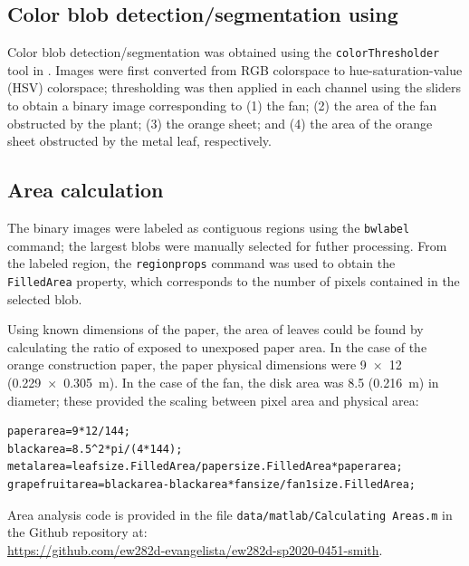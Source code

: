 \subsection{Color blob detection/segmentation using \Matlab}
Color blob detection/segmentation was obtained using the \lstinline{colorThresholder} tool in \Matlab. Images were first converted from RGB colorspace to hue-saturation-value (HSV) colorspace; thresholding was then applied in each channel using the sliders to obtain a binary image corresponding to (1) the fan; (2) the area of the fan obstructed by the plant; (3) the orange sheet; and (4) the area of the orange sheet obstructed by the metal leaf, respectively. 

\subsection{Area calculation}
The binary images were labeled as contiguous regions using the \lstinline{bwlabel} command; the largest blobs were manually selected for futher processing. From the labeled region, the \lstinline{regionprops} command was used to obtain the \lstinline{FilledArea} property, which corresponds to the number of pixels contained in the selected blob. 

Using known dimensions of the paper, the area of leaves could be found by calculating the ratio of exposed to unexposed paper area. In the case of the orange construction paper, the paper physical dimensions were \SI{9x12}{\inch} (\SI{0.229x0.305}{\meter}). In the case of the fan, the disk area was \SI{8.5}{\inch} (\SI{0.216}{\meter}) in diameter; these provided the scaling between pixel area and physical area:
\begin{lstlisting}
paperarea=9*12/144;
blackarea=8.5^2*pi/(4*144);
metalarea=leafsize.FilledArea/papersize.FilledArea*paperarea;
grapefruitarea=blackarea-blackarea*fansize/fan1size.FilledArea;
\end{lstlisting}

Area analysis code is provided in the file \lstinline{data/matlab/Calculating Areas.m} in the Github repository at:\\ \url{https://github.com/ew282d-evangelista/ew282d-sp2020-0451-smith}. 



